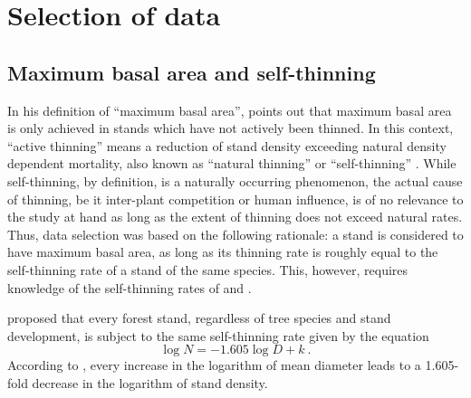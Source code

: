 \section{Selection of data}

\subsection{Maximum basal area and self-thinning}

In his definition of ``maximum basal area'', \textcite{Assmann1970} points out that maximum basal area is only achieved in stands which have not actively been thinned.  In this context, ``active thinning'' means a reduction of stand density exceeding natural density dependent mortality, also known as ``natural thinning'' \parencite{SAF1958} or ``self-thinning'' \parencite{Roehrig1992}.  While self-thinning, by definition, is a naturally occurring phenomenon, the actual cause of thinning, be it inter-plant competition or human influence, is of no relevance to the study at hand as long as the extent of thinning does not exceed natural rates.  Thus, data selection was based on the following rationale: a stand is considered to have maximum basal area, as long as its thinning rate is roughly equal to the self-thinning rate of a stand of the same species.  This, however, requires knowledge of the self-thinning rates of \beech{} and \spruce{}.

\textcite{Reineke1933} proposed that every forest stand, regardless of tree species and stand development, is subject to the same self-thinning rate given by the equation
\begin{equation}
  \label{eq:reineke}
  \log N = -1.605 \log D + k ~.
\end{equation}
According to , every increase in the logarithm of mean diameter leads to a \num{1.605}-fold decrease in the logarithm of stand density.

